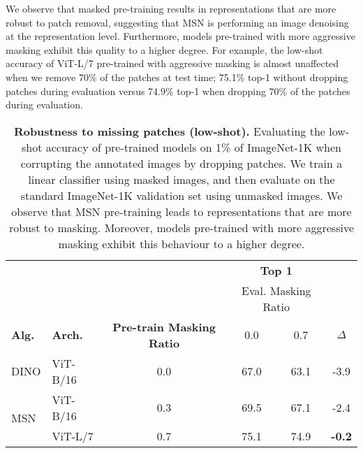 \documentclass{article}
\begin{document}
We observe that masked pre-training results in representations that are more robust to patch removal, suggesting that MSN is performing an image denoising at the representation level.
Furthermore, models pre-trained with more aggressive masking exhibit this quality to a higher degree.
For example, the low-shot accuracy of ViT-L/7 pre-trained with aggressive masking is almost unaffected when we remove 70\% of the patches at test time; 75.1\% top-1 without dropping patches during evaluation versus 74.9\% top-1 when dropping 70\% of the patches during evaluation.
\begin{table}[h]
  \centering
  \caption{{\bf Robustness to missing patches (low-shot).} Evaluating the low-shot accuracy of pre-trained models on 1\% of ImageNet-1K when corrupting the annotated images by dropping patches. We train a linear classifier using masked images, and then evaluate on the standard ImageNet-1K validation set using unmasked images. We observe that MSN pre-training leads to representations that are more robust to masking. Moreover, models pre-trained with more aggressive masking exhibit this behaviour to a higher degree.}
  \label{tb:robust_mask}
   \begin{tabular}{l l c c c | c} 
        & & & \multicolumn{2}{c}{\bf Top 1} \\[2mm]
        & & & \multicolumn{2}{c}{Eval. Masking Ratio} \\
        \bf\small Alg. & \bf\small Arch. & \bf\small Pre-train Masking Ratio & 0.0 & 0.7 & $\Delta$ \\\toprule
        DINO & ViT-B/16 & 0.0 & 67.0 & 63.1 & -3.9\\\midrule
        \multirow{2}{*}{MSN} & ViT-B/16 & 0.3 & 69.5 & 67.1 & -2.4\\
         & ViT-L/7 & 0.7 & 75.1 & 74.9 & \cellcolor{fbApp}\bf -0.2\\ 
        \bottomrule
    \end{tabular}
\end{table}
\end{document}
